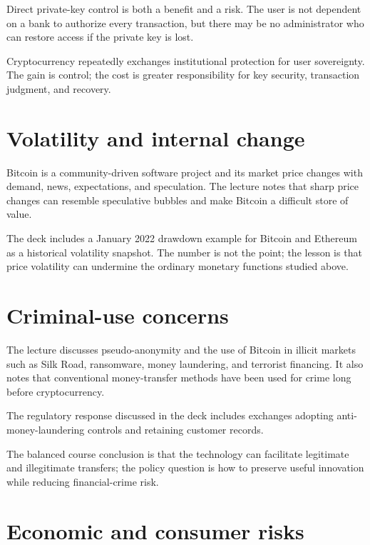 Direct private-key control is both a benefit and a risk. The user is not dependent on a bank to authorize every transaction, but there may be no administrator who can restore access if the private key is lost.

\begin{keyidea}
Cryptocurrency repeatedly exchanges institutional protection for user sovereignty. The gain is control; the cost is greater responsibility for key security, transaction judgment, and recovery.
\end{keyidea}

\section{Volatility and internal change}

Bitcoin is a community-driven software project and its market price changes with demand, news, expectations, and speculation. The lecture notes that sharp price changes can resemble speculative bubbles and make Bitcoin a difficult store of value.

The deck includes a January 2022 drawdown example for Bitcoin and Ethereum as a historical volatility snapshot. The number is not the point; the lesson is that price volatility can undermine the ordinary monetary functions studied above.

\section{Criminal-use concerns}

The lecture discusses pseudo-anonymity and the use of Bitcoin in illicit markets such as Silk Road, ransomware, money laundering, and terrorist financing. It also notes that conventional money-transfer methods have been used for crime long before cryptocurrency.

The regulatory response discussed in the deck includes exchanges adopting anti-money-laundering controls and retaining customer records.

The balanced course conclusion is that the technology can facilitate legitimate and illegitimate transfers; the policy question is how to preserve useful innovation while reducing financial-crime risk.

\section{Economic and consumer risks}

